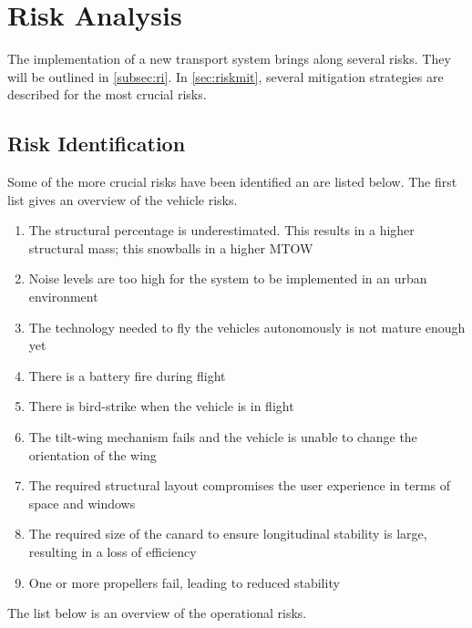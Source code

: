 

\section{Risk Analysis}
\label{sc:RiskAnalysis}
The implementation of a new transport system brings along several risks. They will be outlined in \autoref{subsec:ri}. In \autoref{sec:riskmit}, several mitigation strategies are described for the most crucial risks. 


\subsection{Risk Identification}
\label{subsec:ri}
Some of the more crucial risks have been identified an are listed below. The first list gives an overview of the vehicle risks. 

\begin{enumerate}[nolistsep]
    \item The structural percentage is underestimated. This results in a higher structural mass; this snowballs in a higher MTOW 
    \item Noise levels are too high for the system to be implemented in an urban environment 
    \item The technology needed to fly the vehicles autonomously is not mature enough yet 
    \item There is a battery fire during flight
    \item There is bird-strike when the vehicle is in flight 
    \item The tilt-wing mechanism fails and the vehicle is unable to change the orientation of the wing 
    \item The required structural layout compromises the user experience in terms of space and windows 
    \item The required size of the canard to ensure longitudinal stability is large, resulting in a loss of efficiency 
    \item One or more propellers fail, leading to reduced stability 
\end{enumerate}

The list below is an overview of the operational risks. 

